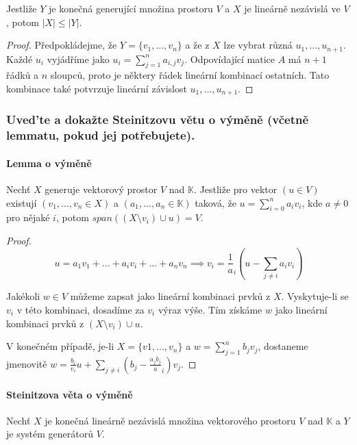 \documentclass[10pt,a4paper]{article}
\begin{document}
Jestliže $Y$ je konečná generující množina prostoru $V$ a $X$ je lineárně nezávislá ve $V$, potom $|X| \leq |Y|$.

\begin{proof}
    Předpokládejme, že $Y = \{v_1, ..., v_n\}$ a že z $X$ lze vybrat různá $u_1, ..., u_{n+1}$. Každé $u_i$ vyjádříme jako $u_i = \displaystyle \sum_{j=1}^n a_{i, j}v_j$. Odpovídající matice $A$ má $n+1$ řádků a $n$ sloupců, proto je některy řádek lineární kombinací ostatních. Tato kombinace také potvrzuje lineární závislost $u_1, ..., u_{n+1}$.
\end{proof}

\subsubsection{Uved’te a dokažte Steinitzovu větu o výměně (včetně lemmatu, pokud jej potřebujete).} 

\paragraph{Lemma o výměně} Nechť $X$ generuje vektorový prostor $V$ nad $\mathbb{K}$. 
Jestliže pro vektor $(u\in V)$ existují $(v_1, ..., v_n \in X)$ a $(a_1, ..., a_n \in \mathbb{K})$ taková, že $u = \displaystyle \sum_{i=0}^n a_iv_i$, kde $a\neq 0$ pro nějaké $i$, potom $span((X \setminus v_i) \cup u) = V$.


\begin{proof}
\begin{equation*}
    u = a_1v_1 + ... + a_iv_i + ... + a_nv_n \implies v_i = \frac1a_i (u - \sum_{j\neq i}a_iv_i)
\end{equation*}

Jakékoli $w\in V$ můžeme zapsat jako lineární kombinaci prvků z $X$. Vyskytuje-li se $v_i$ v této kombinaci, dosadíme za $v_i$ výraz výše. Tím získáme $w$ jako lineární kombinaci prvků z $(X\setminus v_i) \cup u$.

V konečném případě, je-li $X = \{v1, ..., v_n\}$ a $w = \displaystyle \sum_{j=1}^n b_jv_j$, dostaneme jmenovitě $w = \frac{b_i}{v_i} u + \displaystyle \sum_{j\neq i}\left(b_j - \frac{a_jb_j}a_i\right)v_j$.

\end{proof}

\paragraph{Steinitzova věta o výměně} Nechť $X$ je konečná lineárně nezávislá množina vektorového prostoru $V$ nad $\mathbb{K}$ a $Y$ je systém generátorů $V$. 
\end{document}
